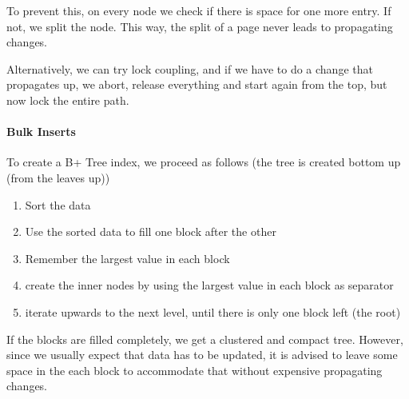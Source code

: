To prevent this, on every node we check if there is space for one more entry. If not, we split the node.
This way, the split of a page never leads to propagating changes.

Alternatively, we can try lock coupling, and if we have to do a change that propagates up, we abort, release everything and start again from the top,
but now lock the entire path.


\paragraph{Bulk Inserts}
To create a B+ Tree index, we proceed as follows (the tree is created bottom up (from the leaves up))
\begin{enumerate}
    \item Sort the data
    \item Use the sorted data to fill one block after the other
    \item Remember the largest value in each block
    \item create the inner nodes by using the largest value in each block as separator
    \item iterate upwards to the next level, until there is only one block left (the root)
\end{enumerate}
If the blocks are filled completely, we get a clustered and compact tree.
However, since we usually expect that data has to be updated, it is advised to leave some space in the each block to accommodate that without expensive propagating changes.
